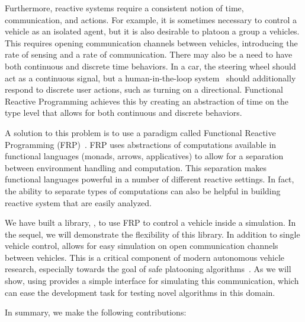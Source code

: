 Furthermore, reactive systems require a consistent notion of time, communication, and actions.
For example, it is sometimes necessary to control a vehicle as an isolated agent, but it is also desirable to platoon a group a vehicles.
This requires opening communication channels between vehicles, introducing the rate of sensing and a rate of communication.
There may also be a need to have both continuous and discrete time behaviors.
In a car, the steering wheel should act as a continuous signal, but a human-in-the-loop system~\cite{li2014synthesis} should additionally respond to discrete user actions, such as turning on a directional.
Functional Reactive Programming achieves this by creating an abstraction of time on the type level that allows for both continuous and discrete behaviors.

A solution to this problem is to use a paradigm called Functional Reactive Programming (FRP)~\cite{hudak2003arrows,hudak2000haskell}.
FRP uses abstractions of computations available in functional languages (\eg monads, arrows, applicatives) to allow for a separation between environment handling and computation.
This separation makes functional languages powerful in a number of different reactive settings.
In fact, the ability to separate types of computations can also be helpful in building reactive system that are easily analyzed.

We have built a library, \ourLib, to use FRP to control a vehicle inside a simulation.
In the sequel, we will demonstrate the flexibility of this library.
In addition to single vehicle control, \ourLib allows for easy simulation on open communication channels between vehicles.
This is a critical component of modern autonomous vehicle research, especially towards the goal of safe platooning algorithms~\cite{?}.
As we will show, using \ourLib provides a simple interface for simulating this communication, which can ease the development task for testing novel algorithms in this domain.

In summary, we make the following contributions:

